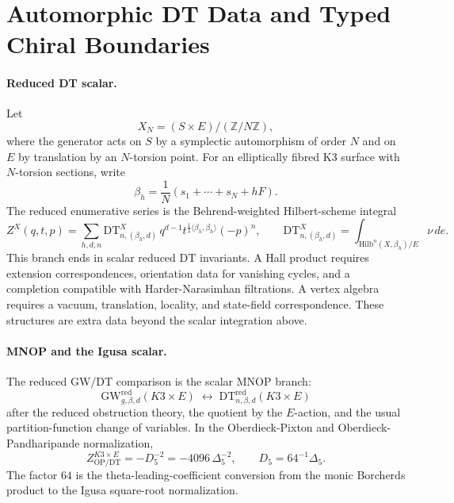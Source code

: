 \providecommand{\kBKM}{\kappa_{\mathrm{BKM}}}
\providecommand{\kch}{\kappa_{\mathrm{ch}}}
\providecommand{\kcat}{\kappa_{\mathrm{cat}}}
\providecommand{\kfib}{\kappa_{\mathrm{fiber}}}
\providecommand{\kHeis}{\kappa_{\mathrm{ch}}^{\mathrm{Heis}}}
\providecommand{\Sp}{\mathbf{Sp}}
\providecommand{\OO}{\mathbf{O}}
\providecommand{\CoHA}{\mathrm{CoHA}}
\providecommand{\DT}{\mathrm{DT}}
\providecommand{\GW}{\mathrm{GW}}
\providecommand{\MNOP}{\mathrm{MNOP}}
\providecommand{\Winf}{\mathcal{W}_{1+\infty}}
\providecommand{\cI}{\mathcal{I}}
\providecommand{\cO}{\mathcal{O}}
\providecommand{\cS}{\mathcal{S}}
\providecommand{\cT}{\mathcal{T}}
\providecommand{\cW}{\mathcal{W}}
\providecommand{\fg}{\mathfrak{g}}
\providecommand{\C}{\mathbb{C}}
\providecommand{\Z}{\mathbb{Z}}

\section*{Automorphic DT Data and Typed Chiral Boundaries}
\label{sec:automorphic-dt-coha-boundary}

\paragraph{Reduced DT scalar.}
Let
\[
 X_N=(S\times E)/(\Z/N\Z),
\]
where the generator acts on \(S\) by a symplectic automorphism of order
\(N\) and on \(E\) by translation by an \(N\)-torsion point.  For an
elliptically fibred K3 surface with \(N\)-torsion sections, write
\[
 \beta_h=\frac{1}{N}(s_1+\cdots+s_N+hF).
\]
The reduced enumerative series is the Behrend-weighted Hilbert-scheme
integral
\[
 Z^X(q,t,p)
 =\sum_{h,d,n}\DT^X_{n,(\beta_h,d)}\,
 q^{d-1}t^{\frac12\langle\beta_h,\beta_h\rangle}(-p)^n,
\qquad
 \DT^X_{n,(\beta_h,d)}
 =\int_{\mathrm{Hilb}^n(X,\beta_h)/E}\nu\,de .
\]
This branch ends in scalar reduced \(\DT\) invariants.  A Hall product
requires extension correspondences, orientation data for vanishing cycles,
and a completion compatible with Harder-Narasimhan filtrations.  A vertex
algebra requires a vacuum, translation, locality, and state-field
correspondence.  These structures are extra data beyond the scalar
integration above.

\paragraph{MNOP and the Igusa scalar.}
The reduced \(\GW/\DT\) comparison is the scalar \(\MNOP\) branch:
\[
 \GW^{\mathrm{red}}_{g,\beta,d}(K3\times E)
 \;\longleftrightarrow\;
 \DT^{\mathrm{red}}_{n,\beta,d}(K3\times E)
\]
after the reduced obstruction theory, the quotient by the \(E\)-action,
and the usual partition-function change of variables.  In the
Oberdieck-Pixton and Oberdieck-Pandharipande normalization,
\[
 Z^{K3\times E}_{\mathrm{OP/DT}}
 =-D_5^{-2}
 =-4096\,\Delta_5^{-2},
\qquad
 D_5=64^{-1}\Delta_5 .
\]
The factor \(64\) is the theta-leading-coefficient conversion from the
monic Borcherds product to the Igusa square-root normalization.

